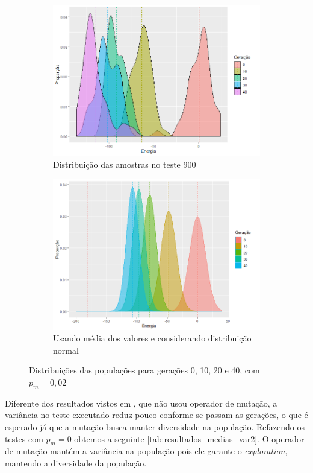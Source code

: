 \begin{figure}[h!]
\begin{subfigure}[b]{0.47\linewidth}
		\includegraphics[width=\linewidth]{imagens/distribuicao_t900.png}
		\caption{Distribuição das amostras no teste 900}
	\end{subfigure}
	\begin{subfigure}[b]{0.47\linewidth}
		\includegraphics[width=\linewidth]{imagens/Distribuicao_medias.png}
		\caption{Usando média dos valores e considerando distribuição normal}
	\end{subfigure}
	\caption{Distribuições das populações para gerações 0, 10, 20 e 40, com \(p_m=0,02\)}
	\label{fig:distribuicao_ising_1}
\end{figure}

Diferente dos resultados vistos em , que não usou operador de mutação, a variância no teste executado reduz pouco conforme se passam as gerações, o que é esperado já que a mutação busca manter diversidade na população. Refazendo os testes com \(p_m = 0\) obtemos a seguinte \autoref{tab:resultados_medias_var2}. O operador de mutação mantém a variância na população pois ele garante o \textit{exploration}, mantendo a diversidade da população.

